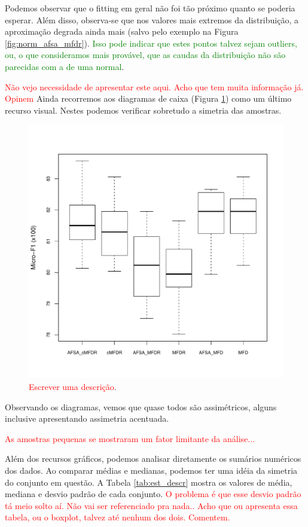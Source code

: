 \documentclass[conference]{IEEEtran}
\begin{document}
Podemos observar que o fitting em geral não foi tão próximo quanto se poderia esperar.
Além disso, observa-se que nos valores mais extremos da distribuição, a aproximação degrada ainda mais (salvo pelo exemplo na Figura \ref{fig:norm_afsa_mfdr}).
\textcolor{green}{Isso pode indicar que estes pontos talvez sejam outliers, ou, o que consideramos mais provável, que as caudas da distribuição não são parecidas com a de uma normal}.

\textcolor{red}{Não vejo necessidade de apresentar este aqui. Acho que tem muita informação já. Opinem}
Ainda recorremos aos diagramas de caixa (Figura \ref{fig:boxplot}) como um último recurso visual. 
Nestes podemos verificar sobretudo a simetria das amostras.

\begin{figure}[h]
	\centering
	\includegraphics[width=\linewidth]{img/blueboxplot.pdf}
	\caption{\textcolor{red}{Escrever uma descrição}.}
	\label{fig:boxplot}
\end{figure}

Observando os diagramas, vemos que quase todos são assimétricos, alguns inclusive apresentando assimetria acentuada.

\textcolor{red}{As amostras pequenas se mostraram um fator limitante da análise...}

Além dos recursos gráficos, podemos analisar diretamente os sumários numéricos dos dados.
Ao comparar médias e medianas, podemos ter uma idéia da simetria do conjunto em questão.
A Tabela \ref{tab:est_descr} mostra os valores de média, mediana e desvio padrão de cada conjunto.
\textcolor{red} {O problema é que esse desvio padrão tá meio solto aí. Não vai ser referenciado pra nada.. Acho que ou apresenta essa tabela, ou o boxplot, talvez até nenhum dos dois. Comentem.}
\end{document}
